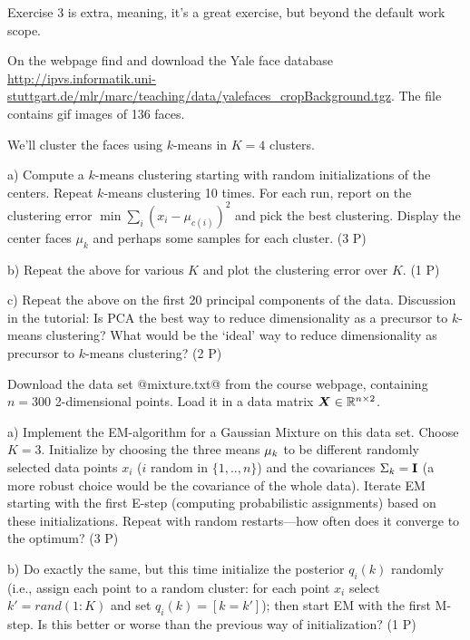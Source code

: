 Exercise 3 is extra, meaning, it's a great exercise, but beyond the default work scope.



On the webpage find and download the Yale face database
{\tiny\url{http://ipvs.informatik.uni-stuttgart.de/mlr/marc/teaching/data/yalefaces_cropBackground.tgz}}. The
file contains gif images of 136 faces.

We'll cluster the faces using $k$-means in $K=4$ clusters.

a) Compute a $k$-means clustering starting with random initializations
of the centers. Repeat $k$-means clustering 10 times. For each run,
report on the clustering error $\min \sum_i (x_i - \mu_{c(i)})^2$ and
pick the best clustering. Display the center faces $\mu_k$ and perhaps
some samples for each cluster. (3 P)

b) Repeat the above for various $K$ and plot the clustering
error over $K$. (1 P)

c) Repeat the above on the first 20 principal components of the
data. Discussion in the tutorial: Is PCA the best way to reduce
dimensionality as a precursor to $k$-means clustering? What would be
the `ideal' way to reduce dimensionality as precursor to $k$-means
clustering? (2 P)



Download the data set @mixture.txt@ from the course webpage,
containing $n=300$ 2-dimensional points. Load it in a data matrix
$\boldsymbol X\in{\mathbb{R}}^{n\times 2}$.

a) Implement the EM-algorithm for a Gaussian Mixture on this data
set. Choose $K=3$. %
Initialize by
choosing the three means $\mu_k$ to be different randomly selected data
points $x_i$ ($i$ random in $\{1,..,n\}$) and the covariances $\Sigma_k
= {\rm\bf I}$ (a more robust choice would be the covariance of the whole
data). Iterate EM starting with the first E-step (computing probabilistic assignments) based on these
initializations. Repeat with random restarts---how often does it
converge to the optimum? (3 P)

b) Do exactly the same, but this time initialize the posterior
$q_i(k)$ randomly (i.e., assign each point to a random cluster: for each point
$x_i$ select $k'={rand}(1:K)$ and set $q_i(k)=[k=k']$); then start EM with the
first M-step. Is this better or worse than the previous way of
initialization? (1 P)


